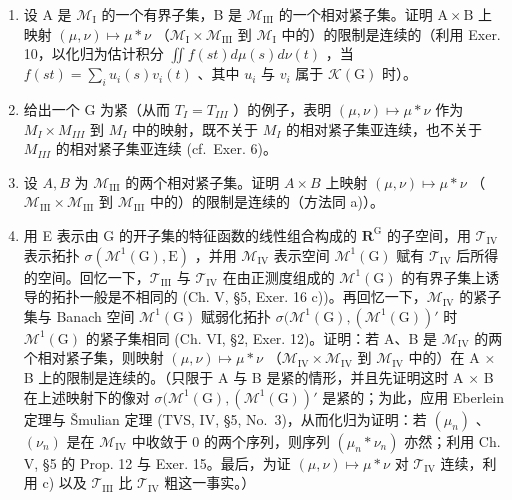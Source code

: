 \begin{enumerate}
\def\labelenumi{\alph{enumi})}
\item
  设 A 是 \(\mathcal{M}_{\mathrm{I}}\) 的一个有界子集，B 是 \(\mathcal{M}_{\mathrm{III}}\) 的一个相对紧子集。证明 \(\mathrm{A} \times \mathrm{B}\) 上映射 \((\mu, \nu) \mapsto \mu * \nu\) （\(\mathcal{M}_{\mathrm{I}} \times \mathcal{M}_{\mathrm{III}}\) 到 \(\mathcal{M}_{\mathrm{I}}\) 中的）的限制是连续的（利用 Exer. 10，以化归为估计积分 \(\iint f(st) d\mu(s) d\nu(t)\) ，当 \(f(st) = \sum_{i} u_{i}(s)v_{i}(t)\) 、其中 \(u_{i}\) 与 \(v_{i}\) 属于 \(\mathcal{K}(\mathrm{G})\) 时）。
\item
  给出一个 G 为紧（从而 \(T_{I} = T_{III}\) ）的例子，表明 \((\mu, \nu) \mapsto \mu * \nu\) 作为 \(M_{I} \times M_{III}\) 到 \(M_{I}\) 中的映射，既不关于 \(M_{I}\) 的相对紧子集亚连续，也不关于 \(M_{III}\) 的相对紧子集亚连续 (cf.~Exer. 6)。
\item
  设 \(A, B\) 为 \(\mathcal{M}_{\mathrm{III}}\) 的两个相对紧子集。证明 \(A \times B\) 上映射 \((\mu, \nu) \mapsto \mu * \nu\) （\(\mathcal{M}_{\mathrm{III}} \times \mathcal{M}_{\mathrm{III}}\) 到 \(\mathcal{M}_{\mathrm{III}}\) 中的）的限制是连续的（方法同 a)）。
\item
  用 E 表示由 G 的开子集的特征函数的线性组合构成的 \(\mathbf{R}^{\mathrm{G}}\) 的子空间，用 \(\mathcal{T}_{\mathrm{IV}}\) 表示拓扑 \(\sigma(\mathcal{M}^{1}(\mathrm{G}),\mathrm{E})\) ，并用 \(\mathcal{M}_{\mathrm{IV}}\) 表示空间 \(\mathcal{M}^{1}(\mathrm{G})\) 赋有 \(\mathcal{T}_{\mathrm{IV}}\) 后所得的空间。回忆一下，\(\mathcal{T}_{\mathrm{III}}\) 与 \(\mathcal{T}_{\mathrm{IV}}\) 在由正测度组成的 \(\mathcal{M}^{1}(\mathrm{G})\) 的有界子集上诱导的拓扑一般是不相同的 (Ch. V, §5, Exer. 16 c))。再回忆一下，\(\mathcal{M}_{\mathrm{IV}}\) 的紧子集与 Banach 空间 \(\mathcal{M}^{1}(\mathrm{G})\) 赋弱化拓扑 \(\sigma(\mathcal{M}^{1}(\mathrm{G}),(\mathcal{M}^{1}(\mathrm{G}))'\) 时 \(\mathcal{M}^{1}(\mathrm{G})\) 的紧子集相同 (Ch. VI, §2, Exer. 12)。证明：若 A、B 是 \(\mathcal{M}_{\mathrm{IV}}\) 的两个相对紧子集，则映射 \((\mu,\nu)\mapsto\mu*\nu\) （\(\mathcal{M}_{\mathrm{IV}}\times\mathcal{M}_{\mathrm{IV}}\) 到 \(\mathcal{M}_{\mathrm{IV}}\) 中的）在 A × B 上的限制是连续的。（只限于 A 与 B 是紧的情形，并且先证明这时 A × B 在上述映射下的像对 \(\sigma(\mathcal{M}^{1}(\mathrm{G}),(\mathcal{M}^{1}(\mathrm{G}))'\) 是紧的；为此，应用 Eberlein 定理与 Šmulian 定理 (TVS, IV, §5, No.~3)，从而化归为证明：若 \((\mu_{n})\) 、\((\nu_{n})\) 是在 \(\mathcal{M}_{\mathrm{IV}}\) 中收敛于 0 的两个序列，则序列 \((\mu_{n}*\nu_{n})\) 亦然；利用 Ch. V, §5 的 Prop. 12 与 Exer. 15。最后，为证 \((\mu,\nu)\mapsto\mu*\nu\) 对 \(\mathcal{T}_{\mathrm{IV}}\) 连续，利用 c) 以及 \(\mathcal{T}_{\mathrm{III}}\) 比 \(\mathcal{T}_{\mathrm{IV}}\) 粗这一事实。）

\end{enumerate}
